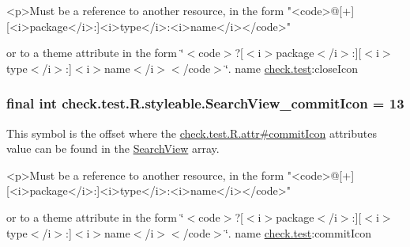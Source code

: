 \begin{DoxyVerb}      <p>Must be a reference to another resource, in the form "<code>@[+][<i>package</i>:]<i>type</i>:<i>name</i></code>"
\end{DoxyVerb}
 or to a theme attribute in the form \char`\"{}$<$code$>$?\mbox{[}$<$i$>$package$<$/i$>$\+:\mbox{]}\mbox{[}$<$i$>$type$<$/i$>$\+:\mbox{]}$<$i$>$name$<$/i$>$$<$/code$>$\char`\"{}.  name \hyperlink{namespacecheck_1_1test}{check.\+test}\+:close\+Icon \hypertarget{classcheck_1_1test_1_1_r_1_1styleable_a31409b8f7f4cf0147ae878cb9dd11c99}{}
\subsubsection[{Search\+View\+\_\+commit\+Icon}]{\setlength{\rightskip}{0pt plus 5cm}final int check.\+test.\+R.\+styleable.\+Search\+View\+\_\+commit\+Icon = 13\hspace{0.3cm}{\ttfamily [static]}}\label{classcheck_1_1test_1_1_r_1_1styleable_a31409b8f7f4cf0147ae878cb9dd11c99}
This symbol is the offset where the \hyperlink{classcheck_1_1test_1_1_r_1_1attr_a862aaa7d2b544ac9dac2c49d10089fa0}{check.\+test.\+R.\+attr\#commit\+Icon} attribute\textquotesingle{}s value can be found in the \hyperlink{classcheck_1_1test_1_1_r_1_1styleable_af133609668e9a4263b21387e9a7574f8}{Search\+View} array.

\begin{DoxyVerb}      <p>Must be a reference to another resource, in the form "<code>@[+][<i>package</i>:]<i>type</i>:<i>name</i></code>"
\end{DoxyVerb}
 or to a theme attribute in the form \char`\"{}$<$code$>$?\mbox{[}$<$i$>$package$<$/i$>$\+:\mbox{]}\mbox{[}$<$i$>$type$<$/i$>$\+:\mbox{]}$<$i$>$name$<$/i$>$$<$/code$>$\char`\"{}.  name \hyperlink{namespacecheck_1_1test}{check.\+test}\+:commit\+Icon \hypertarget{classcheck_1_1test_1_1_r_1_1styleable_a25fc4426b5d6f7fd9c05b2c7b543a9c7}{}
